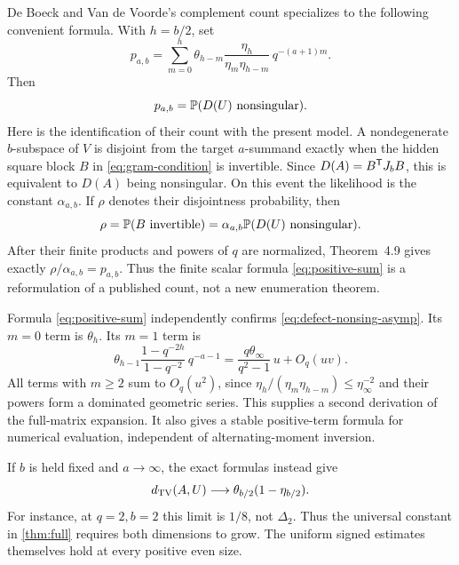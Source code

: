 De Boeck and Van de Voorde's complement count \cite[Theorem~4.9]{DBV}
specializes to the following convenient formula. With \(h=b/2\), set
\begin{equation}\label{eq:positive-sum}
 p_{a,b}
 =\sum_{m=0}^{h}\theta_{h-m}
          \frac{\eta_h}{\eta_m\eta_{h-m}}\,
                    q^{-(a+1)m}.
\end{equation}
Then
\begin{equation}\label{eq:positive-sum-meaning}
 p_{a,b}=\mathbb P(D(U)\text{ nonsingular}).
\end{equation}
Here is the identification of their count with the present model.
A nondegenerate \(b\)-subspace of \(V\) is disjoint from the target
\(a\)-summand exactly when the hidden square block \(B\) in
\eqref{eq:gram-condition} is invertible.
Since \(D(A)=B^{\mathsf T}J_bB\), this is equivalent to
\(D(A)\) being nonsingular.
On this event the likelihood is the constant \(\alpha_{a,b}\).
If \(\rho\) denotes their disjointness probability, then
\[
 \rho=\mathbb P(B\text{ invertible})
       =\alpha_{a,b}\mathbb P(D(U)\text{ nonsingular}).
\]
After their finite products and powers of \(q\) are normalized,
Theorem~4.9 gives exactly
\(\rho/\alpha_{a,b}=p_{a,b}\).
Thus the finite scalar formula \eqref{eq:positive-sum} is a
reformulation of a published count, not a new enumeration theorem.

Formula \eqref{eq:positive-sum} independently confirms
\eqref{eq:defect-nonsing-asymp}. Its \(m=0\) term is
\(\theta_h\). Its \(m=1\) term is
\[
 \theta_{h-1}
    \frac{1-q^{-2h}}{1-q^{-2}}\,q^{-a-1}
       =\frac{q\theta_\infty}{q^2-1}\,u+O_q(uv).
\]
All terms with \(m\ge2\) sum to \(O_q(u^2)\), since
\(\eta_h/(\eta_m\eta_{h-m})\le\eta_\infty^{-2}\)
and their powers form a dominated geometric series.
This supplies a second derivation of the full-matrix expansion.
It also gives a stable positive-term formula for numerical evaluation,
independent of alternating-moment inversion.

\begin{remark}\label{rem:fixed-b}
If \(b\) is held fixed and \(a\to\infty\), the exact formulas instead give
\[
 d_{\mathrm{TV}}(A,U)\longrightarrow
        \theta_{b/2}(1-\eta_{b/2}).
\]
For instance, at \(q=2,b=2\) this limit is \(1/8\), not \(\Delta_2\).
Thus the universal constant in \cref{thm:full} requires both dimensions
to grow. The uniform signed estimates themselves hold at every
positive even size.
\end{remark}

